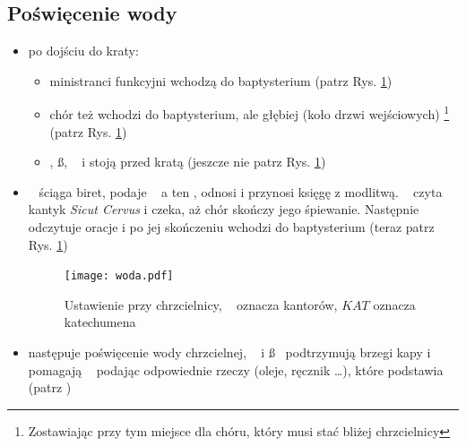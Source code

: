 \subsection{Poświęcenie wody}
\begin{itemize}
	\item po dojściu do kraty:
	      \begin{itemize}
		      \item ministranci funkcyjni wchodzą do baptysterium (patrz Rys.
		            \ref{fig:woda})
		      \item chór też wchodzi do baptysterium, ale głębiej (koło drzwi
		            wejściowych) \footnote{Zostawiając przy tym miejsce dla
			            chóru, który musi stać bliżej chrzcielnicy} (patrz Rys.
		            \ref{fig:woda})
		      \item \ii, \ss, \dd~ i  stoją przed kratą (jeszcze nie patrz
		            Rys. \ref{fig:woda})
	      \end{itemize}
	\item \ii~ ściąga biret, podaje \dd~ a ten ,  odnosi i przynosi
	      księgę z modlitwą. \ii~ czyta kantyk \textit{Sicut Cervus} i czeka, aż
	      chór skończy jego śpiewanie. Następnie odczytuje oracje
	       i po jej skończeniu wchodzi do baptysterium
	      (teraz patrz Rys. \ref{fig:woda})
	      \begin{figure}[h!]
		      \centering
		      \texttt{[image: woda.pdf]}
		      \caption{Ustawienie przy chrzcielnicy, \spiew~ oznacza kantorów,
			      $KAT$ oznacza katechumena}
		      \label{fig:woda}
	      \end{figure}
	\item następuje poświęcenie wody chrzcielnej, \dd~ i \ss~ podtrzymują brzegi
	      kapy i pomagają \ii~ podając odpowiednie rzeczy (oleje, ręcznik
	      \dots), które podstawia 
	      (patrz \textit{})
\end{itemize}
